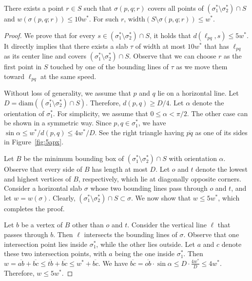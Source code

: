 \documentclass[english,a4paper, cleveref, autoref, thm-restate, nolineno]{socg-lipics-v2021}
\theoremstyle{star}
\theoremstyle{claimstar}
\newcommand{\diam}{\ensuremath{\mathrm{diam}}}
\newcommand{\width}{\ensuremath{\mathrm{width}}}
\begin{document}
\begin{lemma}
    There exists a point $r\in S$ such that $\sigma(p, q;r)$ covers all points of $(\sigma_1^*\setminus \sigma_2^* ) \cap S $ and $w(\sigma(p, q;r)) \le 10 w^*$. 
    For such $r$, $\width(S \setminus \sigma(p, q; r))\le w^*$.
    \label{lem:10apx_existence}
\end{lemma}


\begin{proof}
    We prove that for every $s\in (\sigma_1^* \setminus \sigma_2^*)\cap S$, it holds that $d(\ell_{pq}, s) \le 5w^*$. It directly implies that there exists a slab $\tau$ of width at most $10w^*$ that has $\ell_{pq}$ as its center line and covers $(\sigma_1^*\setminus \sigma_2^* ) \cap S$. 
    Observe that we can choose $r$ as the first point in $S$ touched by one of the bounding lines of $\tau$ as we move them toward $\ell_{pq}$ at the same speed.

    Without loss of generality, we assume that $p$ and $q$ lie on a horizontal line. 
    Let $D = \diam((\sigma_1^* \setminus \sigma_2^*) \cap S)$. 
    Therefore, $d(p, q) \ge D/4$. 
    Let $\alpha$ denote the orientation of $\sigma_1^*$. 
    For simplicity, we assume that $0\le \alpha < \pi/2$. The other case can be shown in a symmetric way. 
    Since $p, q \in \sigma_1^*$, we have $\sin \alpha \le w^*/ d(p, q) \le  4w^*/D$. See the right triangle having $\overline{pq}$ as one of its sides in Figure~\ref{fig:5apx}.
    
    Let $B$ be the minimum bounding box of $(\sigma_1^* \setminus \sigma_2^*) \cap S$ with orientation $\alpha$.
    Observe that every side of $B$ has length at most $D$. 
    Let $o$ and $t$ denote the lowest and highest vertices of $B$, respectively, which lie at diagonally opposite corners.
    Consider a horizontal slab $\sigma$ whose two bounding lines pass through $o$ and $t$, and let $w = w(\sigma)$.  
    Clearly, $(\sigma_1^* \setminus \sigma_2^*) \cap S \subset \sigma$. 
    We now show that $w \le 5w^*$, which completes the proof.

    Let $b$ be a vertex of $B$ other than $o$ and $t$. 
    Consider the vertical line $\ell$ that passes through $b$. Then $\ell$ intersects the bounding lines of $\sigma$. 
    Observe that one intersection point lies inside $\sigma_1^*$, while the other lies outside. 
    Let $a$ and $c$ denote these two intersection points, with $a$ being the one inside $\sigma_1^*$. 
    Then $w = \overline{ab} + \overline{bc} \le \overline{tb} + \overline{bc} \le w^* + \overline{bc}$.
     We have $\overline{bc} = \overline{ob}\cdot \sin \alpha 
    \le D \cdot \frac{4w^*}{D} \le 4w^*$.
    Therefore, $w \le 5w^*$. 
\end{proof}
\end{document}
